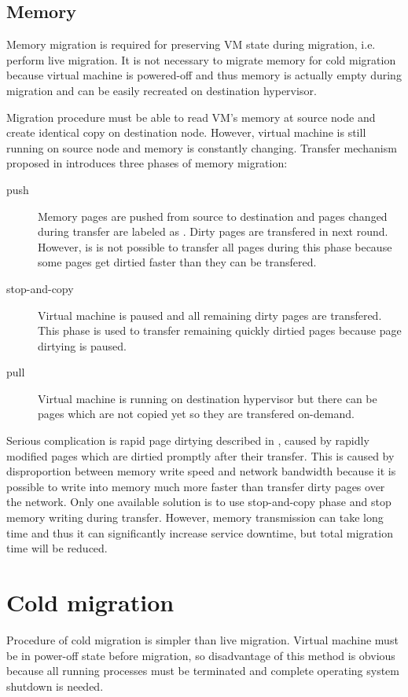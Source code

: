 \subsection{Memory}
Memory migration is required for preserving \Ac{VM} state during migration, i.e. perform live migration. It is not necessary to migrate memory for cold migration because virtual machine is powered-off and thus memory is actually empty during migration and can be easily recreated on destination hypervisor. 

Migration procedure must be able to read \Ac{VM}'s memory at source node and create identical copy on destination node. However, virtual machine is still running on source node and memory is constantly changing. Transfer mechanism proposed in \cite{live-migration-of-vms} introduces three phases of memory migration:
\begin{description}
	\item[push] Memory pages are pushed from source to destination and pages changed during transfer are labeled as . Dirty pages are transfered in next round. However, is is not possible to transfer all pages during this phase because some pages get dirtied faster than they can be transfered.
	\item[stop-and-copy] Virtual machine is paused and all remaining dirty pages are transfered. This phase is used to transfer remaining quickly dirtied pages because page dirtying is paused.
	\item[pull] Virtual machine is running on destination hypervisor but there can be pages which are not copied yet so they are transfered on-demand.
\end{description}

Serious complication is rapid page dirtying described in \cite{live-migration-of-vms}, caused by rapidly modified pages which are dirtied promptly after their transfer. This is caused by disproportion between memory write speed and network bandwidth because it is possible to write into memory much more faster than transfer dirty pages over the network. Only one available solution is to use stop-and-copy phase and stop memory writing during transfer. However, memory transmission can take long time and thus it can significantly increase service downtime, but total migration time will be reduced.

\section{Cold migration}
Procedure of cold migration is simpler than live migration. Virtual machine must be in power-off state before migration, so disadvantage of this method is obvious because all running processes must be terminated and complete operating system shutdown is needed.

